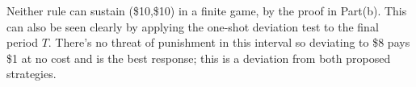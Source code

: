 \documentclass[11pt]{exam}
\begin{document}
\begin{questions}
\begin{parts}
        Neither rule can sustain (\$10,\$10) in a finite game, by the proof in Part(b). This can also be seen clearly by applying the one-shot deviation test to the final period $T$. There's no threat of punishment in this interval so deviating to \$8 pays \$1 at no cost and is the best response; this is a deviation from both proposed strategies. 
    \end{parts}
    
\end{questions}
\end{document}
